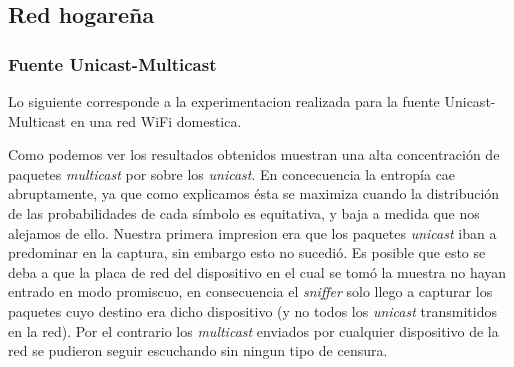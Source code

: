 \subsection{Red hogareña}

\subsubsection{Fuente Unicast-Multicast}

 Lo siguiente corresponde a la experimentacion realizada para la fuente Unicast-Multicast en una red WiFi domestica.
 
\begin{figure}
	\begin{minipage}[b]{0.9\linewidth}
	\end{minipage}
\end{figure}

 Como podemos ver los resultados obtenidos muestran una alta concentración de paquetes \textit{multicast} por sobre los \textit{unicast}. En concecuencia la entropía cae abruptamente, ya que como explicamos ésta se maximiza cuando la distribución de las probabilidades de cada símbolo es equitativa, y baja a medida que nos alejamos de ello. Nuestra primera impresion era que los paquetes \textit{unicast} iban a predominar en la captura, sin embargo esto no sucedió. Es posible que esto se deba a que la placa de red del dispositivo en el cual se tomó la muestra no hayan entrado en modo promiscuo, en consecuencia el \textit{sniffer} solo llego a capturar los paquetes cuyo destino era dicho dispositivo (y no todos los \textit{unicast} transmitidos en la red). Por el contrario los \textit{multicast} enviados por cualquier dispositivo de la red se pudieron seguir escuchando sin ningun tipo de censura.
 
